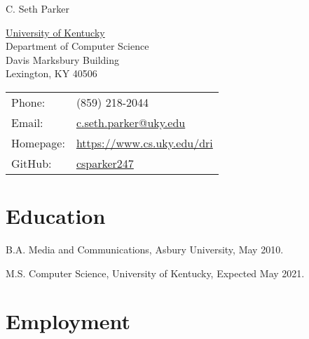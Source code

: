 \documentclass[letterpaper]{article}
\def\name{C. Seth Parker}
\renewenvironment{itemize}{
  \begin{list}{}{
    \setlength{\leftmargin}{1.5em}
  }
}{
  \end{list}
}
\begin{document}
{\huge \name}


\vspace{0.25in}

\begin{minipage}{0.45\linewidth}
  \href{http://www.uky.edu/}{University of Kentucky} \\
  Department of Computer Science \\
  Davis Marksbury Building \\
  Lexington, KY 40506
\end{minipage}
\begin{minipage}{0.45\linewidth}
  \begin{tabular}{ll}
    Phone: & (859) 218-2044 \\
    Email: & \href{mailto:c.seth.parker@uky.edu}{c.seth.parker@uky.edu} \\
    Homepage: & \href{https://www.cs.uky.edu/dri}{https://www.cs.uky.edu/dri} \\
    GitHub: & \href{https://www.github.com/csparker247}{csparker247} \\
  \end{tabular}
\end{minipage}


%


\section*{Education}

\begin{itemize}
  \item B.A. Media and Communications, Asbury University, May 2010.

  \item M.S. Computer Science, University of Kentucky, Expected May 2021.
\end{itemize}


\section*{Employment}
\end{document}
